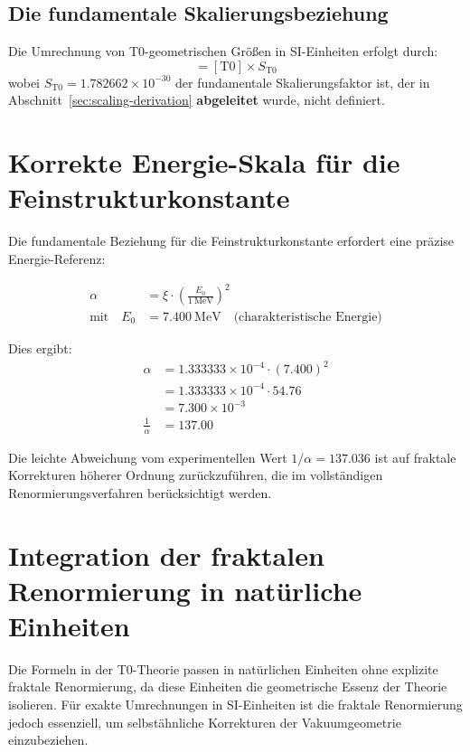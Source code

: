 	\subsection{Die fundamentale Skalierungsbeziehung}
	Die Umrechnung von T0-geometrischen Größen in SI-Einheiten erfolgt durch:
	\begin{equation}
		[\mathrm{SI}] = [\mathrm{T0}] \times S_{\text{T0}}
	\end{equation}
	wobei $S_{\text{T0}} = 1.782662 \times 10^{-30}$ der fundamentale Skalierungsfaktor ist, der in Abschnitt~\ref{sec:scaling-derivation} \textbf{abgeleitet} wurde, nicht definiert.
	
	\section{Korrekte Energie-Skala für die Feinstrukturkonstante}
	
	Die fundamentale Beziehung für die Feinstrukturkonstante erfordert eine präzise Energie-Referenz:
	
	\begin{align}
		\alpha &= \xi \cdot \left( \frac{E_0}{1~\mathrm{MeV}} \right)^2 \\
		\text{mit} \quad E_0 &= 7.400~\mathrm{MeV} \quad \text{(charakteristische Energie)}
	\end{align}
	
	Dies ergibt:
	\begin{align}
		\alpha &= 1.333333 \times 10^{-4} \cdot (7.400)^2 \\
		&= 1.333333 \times 10^{-4} \cdot 54.76 \\
		&= 7.300 \times 10^{-3} \\
		\frac{1}{\alpha} &= 137.00
	\end{align}
	
	Die leichte Abweichung vom experimentellen Wert $1/\alpha = 137.036$ ist auf fraktale Korrekturen höherer Ordnung zurückzuführen, die im vollständigen Renormierungsverfahren berücksichtigt werden.
	
	\section{Integration der fraktalen Renormierung in natürliche Einheiten}
	
	Die Formeln in der T0-Theorie passen in natürlichen Einheiten ohne explizite fraktale Renormierung, da diese Einheiten die geometrische Essenz der Theorie isolieren. Für exakte Umrechnungen in SI-Einheiten ist die fraktale Renormierung jedoch essenziell, um selbstähnliche Korrekturen der Vakuumgeometrie einzubeziehen.
	
